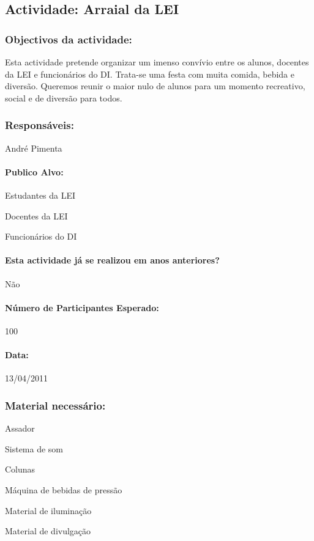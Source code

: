 \subsection{Actividade: Arraial da LEI}

\subsubsection*{Objectivos da actividade:}
Esta actividade pretende organizar um imenso convívio entre os alunos, docentes da LEI e funcionários do DI. Trata-se uma festa com muita comida, bebida e diversão. Queremos reunir o maior nulo de alunos para um momento recreativo, social e de diversão para todos.
\subsubsection*{Responsáveis:}
\begin{itemizedash}
	\item{André Pimenta}
\end{itemizedash}

\paragraph{Publico Alvo: }
\begin{itemizedash}
     \item{Estudantes da LEI}
     \item{Docentes da LEI}
     \item{Funcionários do DI}
\end{itemizedash}

\paragraph{Esta actividade já se realizou em anos anteriores?}
Não

\paragraph{Número de Participantes Esperado:}
100

\paragraph{Data:} 13/04/2011

\subsubsection*{Material necessário:}
\begin{itemizedash}
	\item{Assador}
	\item{Sistema de som}
	\item{Colunas}
	\item{Máquina de bebidas de pressão}
	\item{Material de iluminação}
	\item{Material de divulgação}
\end{itemizedash}

